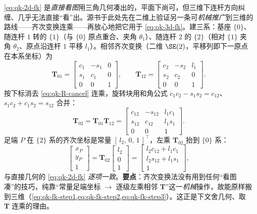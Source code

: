 \begin{derivation}\label{deriv:qk-2d-T}
\cref{eq:qk-2d-fk} 是\emph{直接看图}用三角几何凑出的，平面下尚可，但三维下连杆方向纠缠、几乎无法直接“看”出。源书\cite{unitree2023quadruped}于此处先在二维上验证另一条可\emph{机械推广}到三维的路线——齐次变换连乘——再放心地把它用于 \cref{eq:qk-3d-fk}。建三系：基座 $\{0\}$、随连杆 $1$ 转的 $\{1\}$（与 $\{0\}$ 原点重合、夹角 $\theta_1$）、随连杆 $2$ 的 $\{2\}$（相对 $\{1\}$ 夹角 $\theta_2$、原点沿连杆 $1$ 平移 $l_1$）。相邻齐次变换（二维 $\SE(2)$，平移列即下一原点在本系坐标）为
\begin{equation}
  \mathbf{T}_{01}=\begin{bmatrix}c_1&-s_1&0\\ s_1&c_1&0\\ 0&0&1\end{bmatrix},\qquad
  \mathbf{T}_{12}=\begin{bmatrix}c_2&-s_2&l_1\\ s_2&c_2&0\\ 0&0&1\end{bmatrix}.
  \label{eq:qk-2d-T0112}
\end{equation}
按下标消去 \cref{eq:qk-R-cancel} 连乘，旋转块用和角公式 $c_1c_2-s_1s_2=c_{12}$、$s_1c_2+c_1s_2=s_{12}$ 合并：
\begin{equation}
  \mathbf{T}_{02}=\mathbf{T}_{01}\mathbf{T}_{12}
  =\begin{bmatrix}c_{12}&-s_{12}&l_1 c_1\\ s_{12}&c_{12}&l_1 s_1\\ 0&0&1\end{bmatrix}.
  \label{eq:qk-2d-T02}
\end{equation}
足端 $P$ 在 $\{2\}$ 系的齐次坐标是常量 $[\,l_2,\,0,\,1\,]^\top$，左乘 $\mathbf{T}_{02}$ 抬到 $\{0\}$ 系：
\begin{equation}
  \begin{bmatrix}x_P\\ y_P\\ 1\end{bmatrix}
  =\mathbf{T}_{02}\begin{bmatrix}l_2\\ 0\\ 1\end{bmatrix}
  =\begin{bmatrix}l_2 c_{12}+l_1 c_1\\ l_2 s_{12}+l_1 s_1\\ 1\end{bmatrix},
  \label{eq:qk-2d-fk-T}
\end{equation}
与直接几何的 \cref{eq:qk-2d-fk} \emph{逐项一致}。\textbf{要点}：齐次变换法没有用到任何“看图凑”的技巧，纯靠“常量足端坐标 $\to$ 逐级左乘相邻 $\mathbf{T}$”这一\emph{机械}操作，故能原样搬到三维（\cref{eq:qk-fk-step1,eq:qk-fk-step2,eq:qk-fk-step3}）。这正是下文舍几何、取 $\mathbf{T}$ 连乘的理由。
\end{derivation}


